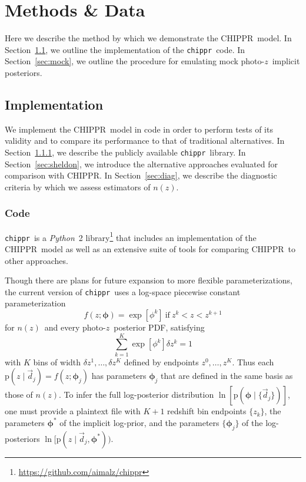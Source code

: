 \documentclass[iop]{emulateapj}
\newcommand{\Sect}[1]{Section~\ref{#1}}
\newcommand{\project}[1]{\textsc{#1}}
\newcommand{\Chippr}{\project{CHIPPR}}%
\newcommand{\repo}[1]{\texttt{#1}}
\newcommand{\chippr}{\repo{chippr}}
\newcommand{\python}{\textit{Python}}%
\newcommand{\data}{\ensuremath{\vec{d}}}%
\newcommand{\pr}[1]{\ensuremath{\mathrm{p}(#1)}}%
\newcommand{\gvn}{\mid}%
\newcommand{\pz}{photo-$z$}
\newcommand{\pzpdf}{\pz\ posterior PDF}%
\newcommand{\pzip}{\pz\ implicit posterior}
\newcommand{\nz}{$n(z)$}
\newcommand{\bvec}[1]{\ensuremath{\boldsymbol{#1}}}%
\newcommand{\ndphi}{\bvec{\phi}}
\begin{document}
\section{Methods \& Data}
\label{sec:application}

Here we describe the method by which we demonstrate the \Chippr\ model.
In \Sect{sec:exp}, we outline the implementation of the \chippr\ code.
In \Sect{sec:mock}, we outline the procedure for emulating mock \pzip s.

\subsection{Implementation}
\label{sec:exp}

We implement the \Chippr\ model in code in order to perform tests of its validity and to compare its performance to that of traditional alternatives.
In \Sect{sec:mcmc}, we describe the publicly available \chippr\ library.
In \Sect{sec:sheldon}, we introduce the alternative approaches evaluated for comparison with \Chippr.
In \Sect{sec:diag}, we describe the diagnostic criteria by which we assess estimators of \nz.

\subsubsection{Code}
\label{sec:mcmc}

\chippr\ is a \python\ 2 library\footnote{\url{https://github.com/aimalz/chippr}} that includes an implementation of the \Chippr\ model as well as an extensive suite of tools for comparing \Chippr\ to other approaches.

Though there are plans for future expansion to more flexible parameterizations, the current version of \chippr\ uses a log-space piecewise constant parameterization
\begin{equation}
\label{eqn:logstepfunc}
f(z; \ndphi) = \exp[\phi^{k}]\ \mathrm{if}\ z^{k} < z < z^{k+1}
\end{equation}
for \nz\ and every \pzpdf, satisfying
\begin{equation}
\label{eqn:logstepfuncnorm}
\sum_{k=1}^{K} \exp[\phi^{k}] \delta z^{k} = 1
\end{equation}
with $K$ bins of width $\delta z^{1}, \dots, \delta z^{K}$ defined by endpoints $z^{0}, \dots, z^{K}$.
Thus each $\pr{z \gvn \data_{j}} = f(z; \ndphi_{j})$ has parameters $\ndphi_{j}$ that are defined in the same basis as those of \nz.
To infer the full log-posterior distribution $\ln[\pr{\ndphi \gvn \{\data_{j}\}}]$, one must provide a plaintext file with $K+1$ redshift bin endpoints $\{z_{k}\}$, the parameters $\ndphi^{*}$ of the implicit log-prior, and the parameters $\{\ndphi_{j}\}$ of the log-posteriors $\ln[\pr{z \gvn \data_{j}, \ndphi^{*})}$.
\end{document}
